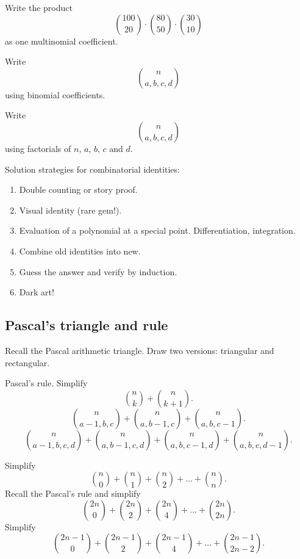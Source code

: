 \documentclass[12pt]{article}
\begin{document}
\begin{exercise}
Write the product
    \[
    {100 \choose 20} \cdot {80 \choose 50} \cdot {30 \choose 10}
    \]
as one multinomial coefficient.
\end{exercise}

\begin{exercise}
Write 
\[
n \choose a, b, c, d
\] using binomial coefficients.

Write 
\[
n \choose a, b, c, d
\]
using factorials of $n$, $a$, $b$, $c$ and $d$.
\end{exercise}

\begin{idea}
Solution strategies for combinatorial identities:
\begin{enumerate}
    \item Double counting or story proof. 
    \item Visual identity (rare gem!).
    \item Evaluation of a polynomial at a special point. Differentiation, integration.
    \item Combine old identities into new. 
    \item Guess the answer and verify by induction. 
    \item Dark art!
\end{enumerate}
\end{idea}

\subsection*{Pascal's triangle and rule}
\begin{exercise}
Recall the Pascal arithmetic triangle. Draw two versions: triangular and rectangular. 
\end{exercise}

\begin{exercise}
Pascal's rule. Simplify
\[
{n \choose k} + {n \choose k+1}.
\]
\[
{n \choose a-1, b, c} + {n \choose a, b-1, c} + {n \choose a, b, c-1}.
\]
\[
{n \choose a-1, b, c, d} + {n \choose a, b-1, c, d} + {n \choose a, b, c-1, d} + {n \choose a, b, c, d-1}.
\]
\end{exercise}

\begin{exercise}
Simplify 
\[
{n \choose 0} + {n \choose 1} + {n \choose 2} + \dots + {n \choose n}.
\]
Recall the Pascal's rule and simplify 
\[
{2n \choose 0} + {2n \choose 2} + {2n \choose 4} + \dots + {2n \choose 2n}.
\]
Simplify
\[
{2n-1 \choose 0} + {2n-1 \choose 2} + {2n-1 \choose 4} + \dots + {2n-1 \choose 2n-2}.
\]
\end{exercise}
\end{document}
